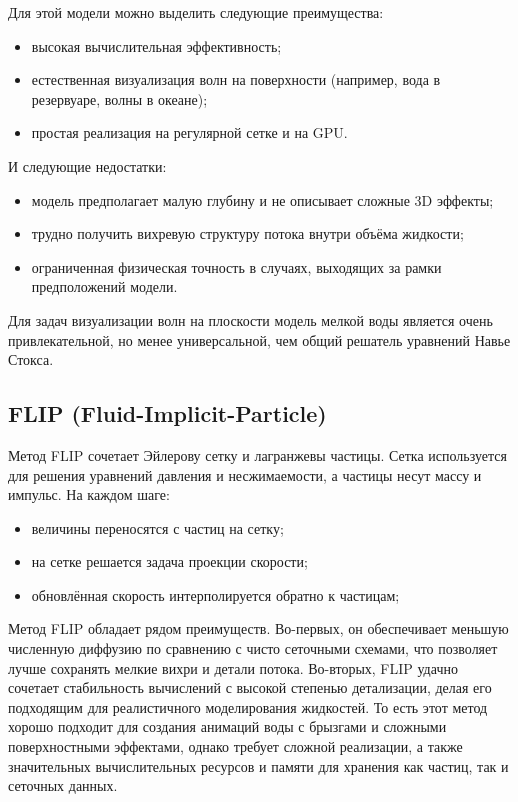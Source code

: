 Для этой модели можно выделить следующие преимущества:

\begin{itemize}
      \item высокая вычислительная эффективность;
      \item естественная визуализация волн на поверхности
            (например, вода в резервуаре, волны в океане);
      \item простая реализация на регулярной сетке и на GPU.
\end{itemize}

И следующие недостатки:

\begin{itemize}
      \item модель предполагает малую глубину и не описывает
            сложные 3D эффекты;
      \item трудно получить вихревую структуру потока
            внутри объёма жидкости;
      \item ограниченная физическая точность в случаях,
            выходящих за рамки предположений модели.
\end{itemize}

Для задач визуализации волн на плоскости модель мелкой
воды является очень привлекательной, но менее универсальной,
чем общий решатель уравнений Навье Стокса.

\subsection{FLIP (Fluid-Implicit-Particle)}

Метод FLIP сочетает Эйлерову сетку и лагранжевы
частицы. Сетка используется для решения уравнений
давления и несжимаемости, а частицы несут массу и
импульс. На каждом шаге:

\begin{itemize}
      \item величины переносятся с частиц на сетку;
      \item на сетке решается задача проекции скорости;
      \item обновлённая скорость интерполируется обратно
            к частицам;
\end{itemize}

Метод FLIP обладает рядом преимуществ. Во-первых, он обеспечивает меньшую численную диффузию по сравнению с чисто сеточными схемами, что позволяет лучше сохранять мелкие вихри и детали потока. Во-вторых, FLIP удачно сочетает стабильность вычислений с высокой степенью детализации, делая его подходящим для реалистичного моделирования жидкостей. То есть этот метод хорошо подходит для создания анимаций воды с брызгами и сложными поверхностными эффектами, однако требует сложной реализации, а также значительных вычислительных ресурсов и памяти для хранения как частиц, так и сеточных данных.

